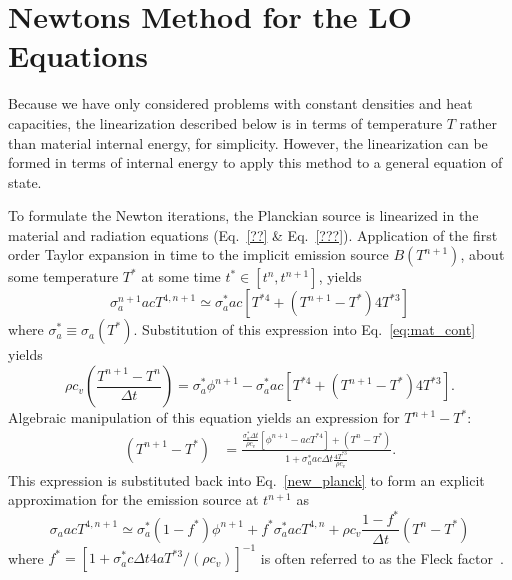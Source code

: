 \section{Newtons Method for the LO Equations}
\label{app:lo_newton}

Because we have only considered problems with constant densities and heat capacities, the
linearization described below is in terms of temperature $T$ rather than material internal
energy, for simplicity. However, the linearization can be formed in terms of internal energy
to apply this method to a general equation of state.

To formulate the Newton iterations, the Planckian source is linearized in the material and radiation equations (Eq.~\eqref{??}
\& Eq.~\eqref{???}).
Application of the first order Taylor expansion in time to the
implicit emission source $B(T^{n+1})$, about some temperature $T^*$ at some
time $t^*\in[t^{n},t^{n+1}]$, yields
\begin{equation}\label{new_planck}
    \sigma_a^{n+1} a c T^{4,n+1} \simeq \sigma_a^* a c \left[T^{*4} + (T^{n+1} - T^*) 4T^{*3} \right]
\end{equation}
where $\sigma_a^*\equiv\sigma_a(T^*)$.  Substitution of this expression into Eq.~\eqref{eq:mat_cont} yields
\begin{equation}
    \rho c_v \left( \frac{T^{n+1} - T^{n}}{\Delta t} \right) = \sigma_a^* \phi^{n+1} -
    \sigma_a^* a c \left[ T^{*4} +  (T^{n+1} - T^*) 4T^{*3} \right].
\end{equation}
Algebraic manipulation of this equation yields an expression for $T^{n+1} - T^{*}$:
\begin{align*}
\left( T^{n+1} - T^* \right) &= \frac{ {\displaystyle \frac{\sigma_a^* \Delta t}{\rho
c_v}}  \left[ \phi^{n+1} -  a c T^{*4} \right] + (T^n - T^*) }{1 +
        \sigma_a^* a c \Delta t\frac{\displaystyle 4
T^{*3}}{\displaystyle \rho c_v } }.
\end{align*}
This expression is substituted back into Eq.~\eqref{new_planck} to form
an explicit approximation for the emission source at $t^{n+1}$ as
\begin{equation}\label{t_next1}
    \sigma_a a c T^{4,n+1} \simeq \sigma_a^* (1 -f^*) \phi^{n+1}
    + f^* \sigma_a^* a c T^{4,n} + \rho c_v\frac{1-f^*}{\Delta t} (T^n - T^*)
\end{equation}
where $f^* = [1 + \sigma_a^* c \Delta t 4 a T^{*3}/(\rho c_v)]^{-1}$ is often referred to
as the Fleck factor~\cite{fnc}. 

